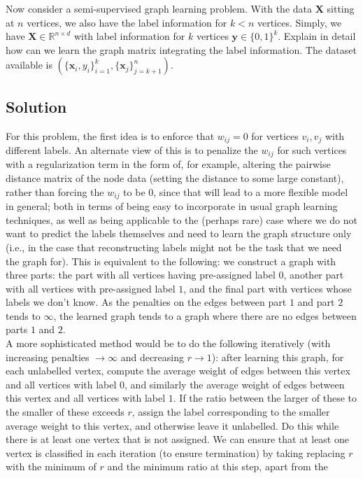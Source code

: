 \documentclass[a4paper]{article}
\newcommand{\nl}{\vspace{0.2cm}\\}
\newcommand{\mf}{\mathbf}
\newcommand{\R}{\mathbb{R}}
\begin{document}
Now consider a semi-supervised graph learning problem. With the data $\mf{X}$ sitting at $n$ vertices, we also have the label information for $k < n$ vertices. Simply, we have $\mf{X} \in \R^{n \times
d}$ with label information for $k$ vertices $\mf{y} \in \{0, 1\}^k$. Explain in detail how can we learn the graph matrix integrating the label information. The dataset available is
$\left(\{\mf{x}_i, y_i\}_{i = 1}^k, \{\mf{x}_j\}_{j = k + 1}^n\right)$.

\subsection{Solution}

For this problem, the first idea is to enforce that $w_{ij} = 0$ for vertices $v_i, v_j$ with different labels. An alternate view of this is to penalize the $w_{ij}$ for such vertices
with a regularization term in the form of, for example, altering the pairwise distance matrix of the node data (setting the distance to some large constant), rather than forcing the $w_{ij}$ to be $0$, since that will lead to a more
flexible model in general; both in terms of being easy to incorporate in usual graph learning techniques, as well as being applicable to the (perhaps rare) case where we do not want to predict the labels themselves and
need to learn the graph structure only (i.e., in the case that reconstructing labels might not be the task that we need the graph for). This is equivalent to the following: we construct a graph with
three parts: the part with all vertices having pre-assigned label $0$, another part with all vertices with pre-assigned label $1$, and the final part with vertices whose labels we don't know. As the
penalties on the edges between part $1$ and part $2$ tends to $\infty$, the learned graph tends to a graph where there are no edges between parts $1$ and $2$.\nl
A more sophisticated method would be to do the following iteratively (with increasing penalties $\to \infty$ and decreasing $r \to 1$): after learning this graph, for each unlabelled vertex, compute
the average weight of edges between this vertex and all vertices with label $0$, and similarly the average weight of edges between this vertex and all vertices with label $1$. If the ratio between
the larger of these to the smaller of these exceeds $r$, assign the label corresponding to the smaller average weight to this vertex, and otherwise leave it unlabelled. Do this while
there is at least one vertex that is not assigned.
We can ensure that at least one vertex is classified in each iteration (to ensure termination) by taking replacing $r$ with the minimum of $r$ and the minimum ratio at this step, apart from the
\end{document}
